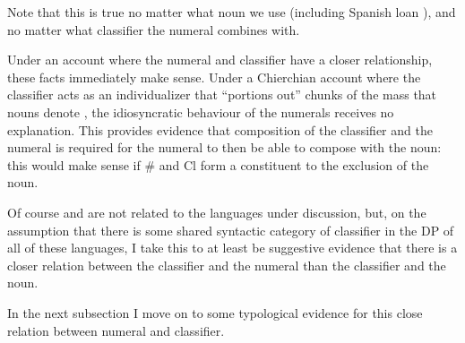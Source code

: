\documentclass[output=paper
,modfonts
,nonflat]{langsci/langscibook}
\begin{document}
\noindent\begin{minipage}{.5\linewidth}

\ea \label{ex:hall:46}

\z
\z

\end{minipage}%
\begin{minipage}{.5\linewidth}

\ea \label{ex:hall:47}

\z
\z
\end{minipage} \vspace{\baselineskip}

Note that this is true no matter what noun we use (including Spanish loan ), and no matter what classifier the numeral combines with. 

Under an account where the numeral and classifier have a closer relationship, these facts immediately make sense. Under a Chierchian account where the classifier acts as an individualizer that ``portions out'' chunks of the mass that nouns denote \citep{Chierchia1998b}, the idiosyncratic behaviour of the numerals receives no explanation. This provides evidence that composition of the classifier and the numeral is required for the numeral to then be able to compose with the noun: this would make sense if \# and Cl form a constituent to the exclusion of the noun.

Of course  and  are not related to the languages under discussion, but, on the assumption that there is some shared syntactic category of classifier in the DP of all of these languages, I take this to at least be suggestive evidence that there is a closer relation between the classifier and the numeral than the classifier and the noun. 

In the next subsection I move on to some typological evidence for this close relation between numeral and classifier. 
\end{document}
